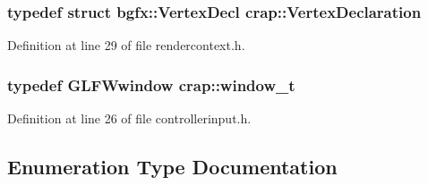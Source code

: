 \subsubsection[{Vertex\+Declaration}]{\setlength{\rightskip}{0pt plus 5cm}typedef struct bgfx\+::\+Vertex\+Decl {\bf crap\+::\+Vertex\+Declaration}}\label{namespacecrap_a5054f00dc3a0c41f32137cf2233a72eb}


Definition at line 29 of file rendercontext.\+h.

\hypertarget{namespacecrap_a3917356677c911215fe8f50465f335bf}{}
\subsubsection[{window\+\_\+t}]{\setlength{\rightskip}{0pt plus 5cm}typedef G\+L\+F\+Wwindow {\bf crap\+::window\+\_\+t}}\label{namespacecrap_a3917356677c911215fe8f50465f335bf}


Definition at line 26 of file controllerinput.\+h.



\subsection{Enumeration Type Documentation}
\hypertarget{namespacecrap_a1118686d0b1bada904e097ebb2799067}{}
